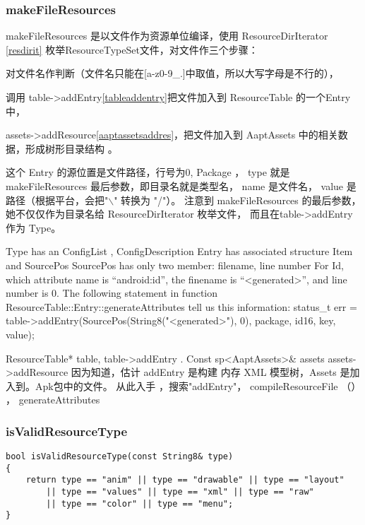 \documentclass[a4paper,11pt]{article}
\begin{document}
\subsubsection{makeFileResources}\label{makefileres}
makeFileResources 是以文件作为资源单位编译，使用 ResourceDirIterator
\cref{resdirit} 枚举ResourceTypeSet文件，对文件作三个步骤：
\begin{itemize*}
\item 对文件名作判断（文件名只能在[a-z0-9_.]中取值，所以大写字母是不行的），
\item 调用 table->addEntry\cref{tableaddentry}把文件加入到 ResourceTable 的一个Entry中，
\item assets->addResource\cref{aaptassetsaddres}，把文件加入到 AaptAssets 
        中的相关数据，形成树形目录结构 。
\end{itemize*}

这个 Entry 的源位置是文件路径，行号为0, Package ， type 就是
makeFileResources 最后参数，即目录名就是类型名， name 是文件名， value
是路径（根据平台，会把"$\backslash$" 转换为 "/"）。               %
注意到 makeFileResources 的最后参数，她不仅仅作为目录名给
ResourceDirIterator 枚举文件， 而且在table->addEntry 作为 Type。

Type has an ConfigList , ConfigDescription
Entry has associated structure Item and SourcePos
SourcePos has only two member: filename, line number
For Id, which attribute name is “android:id”,  the finename is “<generated>”, and line number is 0.  
The following statement in function ResourceTable::Entry::generateAttributes tell us this information:
  status_t err = table->addEntry(SourcePos(String8("<generated>"), 0), package,
                                               id16, key, value);

 ResourceTable* table,   table->addEntry   .
                    Const sp<AaptAssets>\& assets  assets->addResource 
因为知道，估计 addEntry 是构建 内存 XML 模型树，Assets 是加入到。Apk包中的文件。  
从此入手 ，搜索"addEntry"， compileResourceFile （）  ， generateAttributes

\subsubsection{isValidResourceType}
\begin{lstlisting}
bool isValidResourceType(const String8& type)
{
    return type == "anim" || type == "drawable" || type == "layout"
        || type == "values" || type == "xml" || type == "raw"
        || type == "color" || type == "menu";
}
\end{lstlisting}
\end{document}
